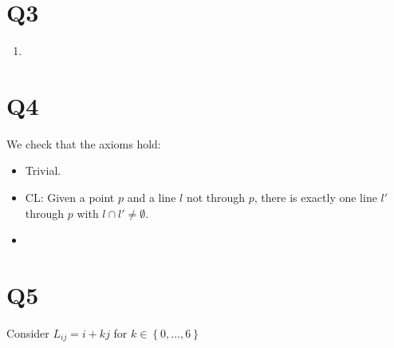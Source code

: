 \documentclass[a4paper, 11pt]{article}
\newcommand{\ZZ}{\mathbb{Z}}
\def\set#1{\left\{ #1 \right\}}
\begin{document}

\section*{Q3}
\begin{enumerate}[label=(\alph*)]
	\item 
\end{enumerate}

\section*{Q4}
We check that the axioms hold: 

\begin{itemize}
	\item Trivial. 

	\item 
		CL: Given a point $p$ and a line $l$ not through $p$, there is exactly one line $l'$ through $p$ with $l\cap l'\neq \emptyset$.
		
	\item 
\end{itemize}


\section*{Q5}
Consider $L_{ij}=i+kj$ for $k\in\set{0,\dots,6}$

\pagebreak
\end{document}
